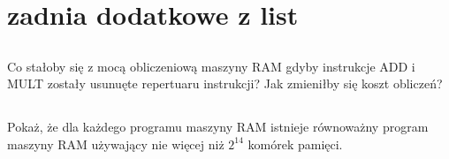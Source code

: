 \documentclass[svgnames]{report}
\begin{document}
\chapter{zadnia dodatkowe z list}

\section{}
\begin{framed}
Co stałoby się z mocą obliczeniową maszyny RAM gdyby instrukcje ADD i MULT zostały usunuęte repertuaru instrukcji? Jak zmieniłby się koszt obliczeń?
\end{framed}

\section{}
\begin{framed}
Pokaż, że dla każdego programu maszyny RAM istnieje równoważny program maszyny RAM używający nie więcej niż $2^14$ komórek pamięci.
\end{framed}


\begin{thebibliography}{99}
\end{thebibliography}
\end{document}
